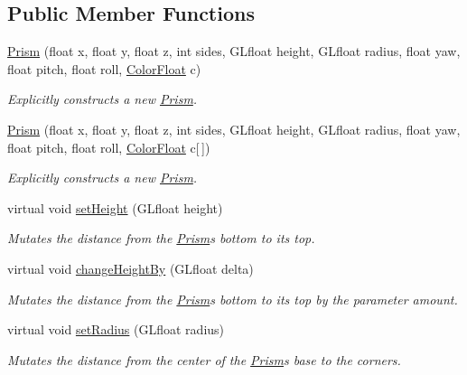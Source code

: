 \subsection*{Public Member Functions}
\begin{DoxyCompactItemize}
\item 
\hyperlink{classtsgl_1_1_prism_a4e4b0cdd81d76d48f032a691df2d81c2}{Prism} (float x, float y, float z, int sides, G\+Lfloat height, G\+Lfloat radius, float yaw, float pitch, float roll, \hyperlink{structtsgl_1_1_color_float}{Color\+Float} c)
\begin{DoxyCompactList}\small\item\em Explicitly constructs a new \hyperlink{classtsgl_1_1_prism}{Prism}. \end{DoxyCompactList}\item 
\hyperlink{classtsgl_1_1_prism_a665fe3ba2d8c0255b0090170ac5bc643}{Prism} (float x, float y, float z, int sides, G\+Lfloat height, G\+Lfloat radius, float yaw, float pitch, float roll, \hyperlink{structtsgl_1_1_color_float}{Color\+Float} c\mbox{[}$\,$\mbox{]})
\begin{DoxyCompactList}\small\item\em Explicitly constructs a new \hyperlink{classtsgl_1_1_prism}{Prism}. \end{DoxyCompactList}\item 
virtual void \hyperlink{classtsgl_1_1_prism_a33bc4c80ac4d5cbb8c33a657fca01524}{set\+Height} (G\+Lfloat height)
\begin{DoxyCompactList}\small\item\em Mutates the distance from the \hyperlink{classtsgl_1_1_prism}{Prism}\textquotesingle{}s bottom to its top. \end{DoxyCompactList}\item 
virtual void \hyperlink{classtsgl_1_1_prism_a97e94e9e2b395f604573bcb5ef646f15}{change\+Height\+By} (G\+Lfloat delta)
\begin{DoxyCompactList}\small\item\em Mutates the distance from the \hyperlink{classtsgl_1_1_prism}{Prism}\textquotesingle{}s bottom to its top by the parameter amount. \end{DoxyCompactList}\item 
virtual void \hyperlink{classtsgl_1_1_prism_afab75920c51c0104d20f78534fac3656}{set\+Radius} (G\+Lfloat radius)
\begin{DoxyCompactList}\small\item\em Mutates the distance from the center of the \hyperlink{classtsgl_1_1_prism}{Prism}\textquotesingle{}s base to the corners. \end{DoxyCompactList}\item 

\end{DoxyCompactItemize}
